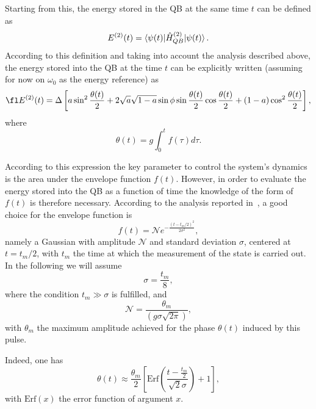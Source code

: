 \documentclass[12pt]{iopart}
\begin{document}
Starting from this, the energy stored in the QB at the same time $t$ can be defined as~\cite{Andolina18, Ferraro18}
\begin{equation}
E^{(2)}(t)=\braket{\psi(t)|\hat{H}_{QB}^{(2)}|\psi(t)}.
\end{equation}
According to this definition and taking into account the analysis described above, the energy stored into the QB at the time $t$ can be explicitly written (assuming for now on $\omega_{0}$ as the energy reference) as 
\begin{equation}
\fl E^{(2)}(t)=\Delta  \left[a \sin^{2}{\frac{\theta(t)}{2}} +2 \sqrt{a} \sqrt{1-a} \sin\phi\sin{\frac{\theta(t)}{2}}\cos{\frac{\theta(t)}{2}}+(1-a) \cos^{2}{\frac{\theta(t)}{2}}\right],  
\label{eq:E_m_par}
\end{equation} 
where 
\begin{equation}
\theta(t)=g\int_0^{t}f(\tau)d\tau.
\end{equation} 

According to this expression the key parameter to control the system's dynamics is the area under the envelope function $f(t)$. However, in order to evaluate the energy stored into the QB as a function of time the knowledge of the form of $f(t)$ is therefore necessary. According to the analysis reported in~\cite{Gemme22}, a good choice for the envelope function is
\begin{equation}
f(t)=\mathcal{N}e^{-\frac{(t-t_m/2)^2}{2\sigma^2}},
\label{eq:Gaussian}
\end{equation} 
namely a Gaussian with amplitude $\mathcal{N}$ and standard deviation $\sigma$, centered at $t=t_{m}/2$, with $t_{m}$ the time at which the measurement of the state is carried out. In the following we will assume
\begin{equation}
\sigma=\frac{t_m}{8},
\end{equation}
where the condition $t_{m}\gg \sigma$ is fulfilled, and 
\begin{equation}
\mathcal{N}=\frac{\theta_{m}}{(g\sigma\sqrt{2\pi})},
\end{equation}
with $\theta_{m}$ the maximum amplitude achieved for the phase $\theta(t)$ induced by this pulse. 


Indeed, one has 
\begin{equation}
    \theta(t)\approx\frac{\theta_{m}}{2}\left[\text{Erf}\left(\frac{t-\frac{t_m}{2}}{\sqrt{2}\sigma }\right)+1\right],
\label{theta_t}
\end{equation}
with $\text{Erf}(x)$ the error function of argument $x$.
\end{document}
